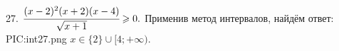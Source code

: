 27. $\cfrac{(x-2)^2(x+2)(x-4)}{\sqrt{x+1}}\geqslant0.$
Применив метод интервалов, найдём ответ:
{{PIC:int27.png}}
$x\in\{2\}\cup[4;+\infty).$\\
